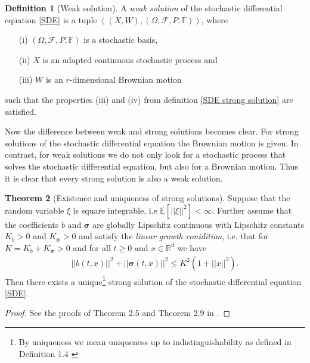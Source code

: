 \documentclass[11pt,titlepage]{article}
\newcommand{\R}{\mathbb{R}} %
\newcommand{\E}{\mathbb{E}} %
\newcommand{\abs}[1]{{\left| #1 \right|}}
\theoremstyle{definition}
\newtheorem{theorem}{Theorem}[section]
\newtheorem{definition}[theorem]{Definition}
\theoremstyle{remark}
\begin{document}
	\begin{definition}[Weak solution]
		A \textsl{weak solution} of the stochastic differential equation \ref{SDE} is a tuple 
		$((X,W),(\Omega, \mathcal{F}, P,\mathbb{F}))$, where
		\begin{itemize}
			\item[(i)] $(\Omega, \mathcal{F}, P,\mathbb{F})$ is a stochastic basis,
			\item[(ii)] $X$ is an adapted continuous stochastic process and 
			\item[(iii)] $W$ is an $r$-dimensional Brownian motion
		\end{itemize}
		such that the properties (iii) and (iv) from definition 
		\ref{SDE strong solution} are satisfied.
	\end{definition}
	
	Now the difference between weak and strong solutions becomes clear.
	For strong solutions of the stochastic differential equation the Brownian motion is given. 
	In contrast, for weak solutions we do not only look for a stochastic process that solves 
	the stochastic differential equation, but also for a Brownian motion. 
	Thus it is clear that every strong solution is also a weak solution. 
	
	\begin{theorem}[Existence and uniqueness of strong solutions]\label{Strong sol ex un}
		Suppose that the random variable $\xi$ is square integrable, i.e $\E[\abs{\abs{\xi}}^2]< \infty$. Further assume that the coefficients $b$ and $\boldsymbol{\sigma}$ are globally Lipschitz continuous with Lipschitz constants $K_b>0$ and $K_{\boldsymbol{\sigma}}>0$ 
		and satisfy the \textsl{linear growth conidition}, i.e. that 
		for $K=K_b + K_{\boldsymbol{\sigma}}>0$ and for all $t\geq 0$ and $x\in\R^d$ we have
		\begin{align}
			\abs{\abs{b(t, x)}}^2 + \abs{\abs{\boldsymbol{\sigma}(t,x)}}^2 \leq K^2 (1+\abs{\abs{x}}^2).\label{SDE Zusatzannahme}
		\end{align}
		Then there exists a unique\footnote{By uniqueness we mean uniqueness up to indistinguishability as defined in Definition 1.4 \cite{StoProSchmidt2021}} strong solution of the stochastic differential equation \ref{SDE}.
	\end{theorem}

	\begin{proof}
		See the proofs of Theorem 2.5 and Theorem 2.9 in 
		\cite{Karatzas2012}.
	\end{proof}
	
\end{document}
